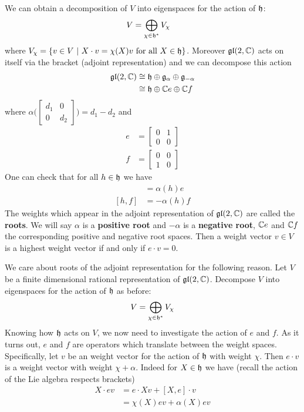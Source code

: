 \documentclass{amsart}
\numberwithin{equation}{section}
\theoremstyle{plain} %
\theoremstyle{definition}
\theoremstyle{remark}
\begin{document}
\hfill

We can obtain a decomposition of $V$ into eigenspaces for the action of $\mathfrak{h}$: \begin{align*}
	V & = \bigoplus_{\chi\in \mathfrak{h}^*} V_\chi
\end{align*} where $V_\chi = \{v\in V \ \vert \  X\cdot v = \chi(X)v \text{ for all $X\in \mathfrak{h}$}\}$. Moreover
$\operatorname{\mathfrak{gl}}(2,\mathbb{C})$ acts on itself via the bracket (adjoint representation) and we can
decompose this action \begin{align*}
	\operatorname{\mathfrak{gl}}(2,\mathbb{C}) & \cong \mathfrak{h} \oplus \mathfrak{g}_{\alpha} \oplus \mathfrak{g}_{-\alpha} \\
	          & \cong \mathfrak{h} \oplus \mathbb{C} e \oplus \mathbb{C} f
\end{align*} where $\alpha\big(\begin{bmatrix}
			d_1 & 0   \\
			0   & d_2
		\end{bmatrix}\big) = d_1 - d_2$ and \begin{align*}
	e & = \begin{bmatrix}
		      0 & 1 \\
		      0 & 0
	      \end{bmatrix} \\
	f & = \begin{bmatrix}
		      0 & 0 \\
		      1 & 0
	      \end{bmatrix}
\end{align*} One can check that for all $h\in \mathfrak{h}$ we have  \begin{align*}
	[h, e] & = \alpha(h)e \\ [h, f] &= -\alpha(h)f
\end{align*} The weights which appear in the adjoint representation of $\operatorname{\mathfrak{gl}}(2,\mathbb{C})$ are called the \textbf{roots}.
We will say $\alpha$ is a \textbf{positive root} and $-\alpha$ is a \textbf{negative root}, $\mathbb{C} e$ and $\mathbb{C} f$ the corresponding positive and negative root spaces.
Then a weight vector $v\in V$ is a highest weight vector if and only if $e\cdot v = 0$.

\hfill

We care about roots of the adjoint representation for the following reason. Let $V$ be a finite dimensional rational representation of $\operatorname{\mathfrak{gl}}(2,\mathbb{C})$.
Decompose $V$ into eigenspaces for the action of $\mathfrak{h}$ as before: \begin{align*}
	V = \bigoplus_{\chi \in \mathfrak{h}^*} V_\chi
\end{align*} Knowing how $\mathfrak{h}$ acts on $V$, we now need to investigate the action of $e$ and $f$. As it turns out,
$e$ and $f$ are operators which translate between the weight spaces.
Specifically, let $v$ be an weight vector for the action of $\mathfrak{h}$ with weight $\chi$.
Then $e\cdot v$ is a weight vector with weight $\chi + \alpha$. Indeed for $X\in \mathfrak{h}$ we have (recall the action of the Lie algebra respects brackets)
\begin{align*}
	X\cdot ev & = e \cdot Xv + [X,e]\cdot v \\
	          & = \chi(X)ev + \alpha(X)ev
\end{align*}
\end{document}
